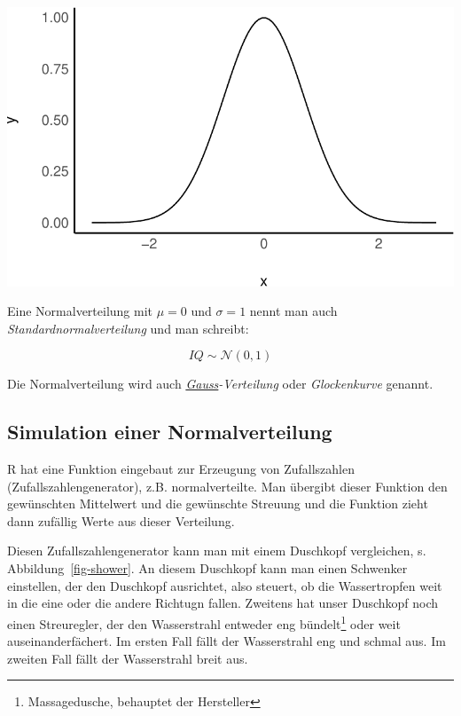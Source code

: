 \documentclass[
  a4paper,
  DIV=11]{scrreprt}
\theoremstyle{definition}
\theoremstyle{remark}
\begin{document}
\includegraphics{./Verteilungen_files/figure-pdf/Normalverteilung-10-1.pdf}

Eine Normalverteilung mit \(\mu=0\) und \(\sigma=1\) nennt man auch
\emph{Standardnormalverteilung} und man schreibt:

\[IQ \sim \mathcal{N}(0,1)\]

Die Normalverteilung wird auch
\emph{\href{https://de.wikipedia.org/wiki/Carl_Friedrich_Gau\%C3\%9F}{Gauss}-Verteilung}
oder \emph{Glockenkurve} genannt.

\hypertarget{simulation-einer-normalverteilung}{%
\subsection{Simulation einer
Normalverteilung}\label{simulation-einer-normalverteilung}}

R hat eine Funktion eingebaut zur Erzeugung von Zufallszahlen
(Zufallszahlengenerator), z.B. normalverteilte. Man übergibt dieser
Funktion den gewünschten Mittelwert und die gewünschte Streuung und die
Funktion zieht dann zufällig Werte aus dieser Verteilung.

Diesen Zufallszahlengenerator kann man mit einem Duschkopf vergleichen,
s. Abbildung~\ref{fig-shower}. An diesem Duschkopf kann man einen
Schwenker einstellen, der den Duschkopf ausrichtet, also steuert, ob die
Wassertropfen weit in die eine oder die andere Richtugn fallen. Zweitens
hat unser Duschkopf noch einen Streuregler, der den Wasserstrahl
entweder eng bündelt\footnote{Massagedusche, behauptet der Hersteller}
oder weit auseinanderfächert. Im ersten Fall fällt der Wasserstrahl eng
und schmal aus. Im zweiten Fall fällt der Wasserstrahl breit aus.
\end{document}
